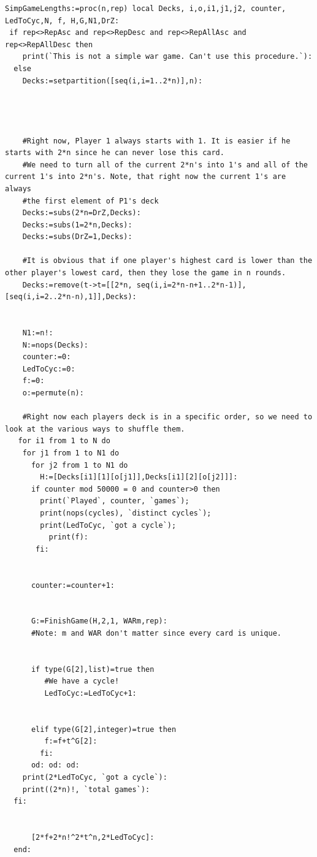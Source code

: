 \documentclass[12pt]{amsart}
\begin{document}
\begin{lstlisting}
SimpGameLengths:=proc(n,rep) local Decks, i,o,i1,j1,j2, counter, LedToCyc,N, f, H,G,N1,DrZ:
 if rep<>RepAsc and rep<>RepDesc and rep<>RepAllAsc and rep<>RepAllDesc then
    print(`This is not a simple war game. Can't use this procedure.`):
  else
    Decks:=setpartition([seq(i,i=1..2*n)],n):  




    #Right now, Player 1 always starts with 1. It is easier if he starts with 2*n since he can never lose this card.
    #We need to turn all of the current 2*n's into 1's and all of the current 1's into 2*n's. Note, that right now the current 1's are always 
    #the first element of P1's deck
    Decks:=subs(2*n=DrZ,Decks):  
    Decks:=subs(1=2*n,Decks):
    Decks:=subs(DrZ=1,Decks):
    
    #It is obvious that if one player's highest card is lower than the other player's lowest card, then they lose the game in n rounds.
    Decks:=remove(t->t=[[2*n, seq(i,i=2*n-n+1..2*n-1)],[seq(i,i=2..2*n-n),1]],Decks):


    N1:=n!: 
    N:=nops(Decks): 
    counter:=0:
    LedToCyc:=0:
    f:=0:
    o:=permute(n):
   
    #Right now each players deck is in a specific order, so we need to look at the various ways to shuffle them.
   for i1 from 1 to N do
    for j1 from 1 to N1 do
      for j2 from 1 to N1 do
        H:=[Decks[i1][1][o[j1]],Decks[i1][2][o[j2]]]: 
      if counter mod 50000 = 0 and counter>0 then                
        print(`Played`, counter, `games`);
        print(nops(cycles), `distinct cycles`);
        print(LedToCyc, `got a cycle`);
          print(f):
       fi:


      counter:=counter+1:


      G:=FinishGame(H,2,1, WARm,rep):
      #Note: m and WAR don't matter since every card is unique.


      if type(G[2],list)=true then 
         #We have a cycle!
         LedToCyc:=LedToCyc+1:


      elif type(G[2],integer)=true then
         f:=f+t^G[2]:
        fi:
      od: od: od:
    print(2*LedToCyc, `got a cycle`):
    print((2*n)!, `total games`):
  fi:


      [2*f+2*n!^2*t^n,2*LedToCyc]:
  end:
\end{lstlisting}
\end{document}

